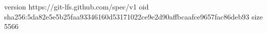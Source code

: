 version https://git-lfs.github.com/spec/v1
oid sha256:5da82e5e5b25faa93346160d53171022ce9e2d90affbcaafce9657fac86deb93
size 5566
